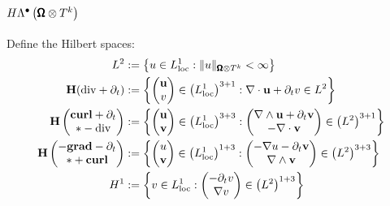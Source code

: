         \subsection*{$H\Lambda^{\bullet}\left(\pmb{\mathsf{\Omega}}\otimes T^{k}\right)$}
            Define the Hilbert spaces:
            \begin{align}
                L^{2}  &:=  \left\{u \in L^{1}_{\rm loc} : \|u\|_{\pmb{\mathsf{\Omega}}\otimes T^{k}} < \infty\right\}  \\
                \mathbf{H}(\mathrm{div} + \partial_{t})  &:=  \left\{\begin{pmatrix} \mathbf{u} \\ v \end{pmatrix} \in \left(L^{1}_{\rm loc}\right)^{3 + 1} : \nabla\cdot\mathbf{u} + \partial_{t}v \in L^{2}\right\}  \\
                \mathbf{H}\left(\begin{matrix} \mathbf{curl} + \partial_{t} \\ * - \mathrm{div} \end{matrix}\right)  &:=  \left\{\begin{pmatrix} \mathbf{u} \\ \mathbf{v} \end{pmatrix} \in \left(L^{1}_{\rm loc}\right)^{3 + 3} : \begin{pmatrix} \nabla\wedge\mathbf{u} + \partial_{t}\mathbf{v} \\ - \nabla\cdot\mathbf{v} \end{pmatrix} \in \left(L^{2}\right)^{3 + 1}\right\}  \\
                \mathbf{H}\left(\begin{matrix} - \mathbf{grad} - \partial_{t} \\ * + \mathbf{curl} \end{matrix}\right)  &:=  \left\{\begin{pmatrix} u \\ \mathbf{v} \end{pmatrix} \in \left(L^{1}_{\rm loc}\right)^{1 + 3} : \begin{pmatrix} - \nabla u - \partial_{t}\mathbf{v} \\ \nabla\wedge\mathbf{v} \end{pmatrix} \in \left(L^{2}\right)^{3 + 3}\right\}  \\
                H^{1}  &:=  \left\{v \in L^{1}_{\rm loc} : \begin{pmatrix} - \partial_{t}v \\ \nabla v \end{pmatrix} \in \left(L^{2}\right)^{1 + 3}\right\}
            \end{align}
